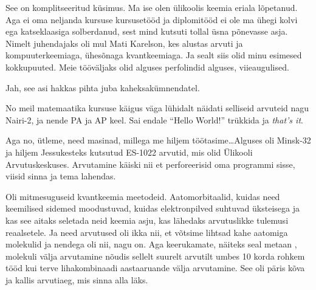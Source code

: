 \label{chptr:lucifer}

                 
See on komplitseeritud küsimus. Ma ise olen ülikoolis keemia eriala lõpetanud. Aga ei oma neljanda kursuse kursusetööd ja diplomitööd ei ole ma ühegi kolvi ega katseklaasiga solberdanud, sest  mind kutsuti tollal üsna põnevasse asja. Nimelt juhendajaks oli mul Mati Karelson, kes alustas arvuti ja kompuuterkeemiaga,  ühesõnaga kvantkeemiaga.  Ja sealt siis olid minu esimesed kokkupuuted. Meie tööväljaks olid alguses perfolindid alguses, viieaugulised.


Jah, see asi hakkas pihta juba kaheksakümnendatel.
                 

No meil matemaatika kursuse käigus väga lühidalt näidati selliseid arvuteid nagu Nairi-2, ja nende PA ja AP keel. Sai endale \enquote{Hello World!} trükkida ja \emph{that's it}. 

Aga no, ütleme, need masinad, millega me hiljem töötasime\ldots Alguses oli Minsk-32 ja hiljem  Jessukesteks kutsutud ES-1022 arvutid, mis olid Ülikooli Arvutuskeskuses. Arvutamine käiski nii et  perforeerisid oma programmi sisse, viisid sinna ja tema lahendas. 


Oli mitmesuguseid kvantkeemia meetodeid. Aatomorbitaalid, kuidas need keemilised sidemed moodustuvad, kuidas elektronpilved suhtuvad üksteisega ja kas see aitaks seletada neid keemia asju, kas  lähedaks arvutuslikke tulemusi reaalsetele. Ja need arvutused oli ikka nii, et võtsime lihtsad kahe aatomiga molekulid ja nendega oli nii,  nagu on. Aga keerukamate, näiteks seal metaan ,  molekuli välja arvutamine nõudis  sellelt suurelt arvutilt umbes 10 korda rohkem tööd kui terve lihakombinaadi aastaaruande välja arvutamine. See oli päris kõva ja kallis arvutiaeg, mis sinna alla läks.
           

